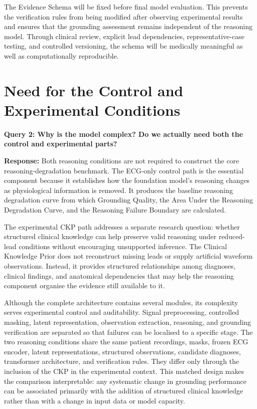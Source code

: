 \documentclass{ssnreview}
\begin{document}
The Evidence Schema will be fixed before final model evaluation. This prevents the
verification rules from being modified after observing experimental results and ensures
that the grounding assessment remains independent of the reasoning model. Through
clinical review, explicit lead dependencies, representative-case testing, and controlled
versioning, the schema will be medically meaningful as well as computationally
reproducible.

\section{Need for the Control and Experimental Conditions}

\textbf{Query 2: Why is the model complex? Do we actually need both the control and
experimental parts?}

\textbf{Response:} Both reasoning conditions are not required to construct the core
reasoning-degradation benchmark. The ECG-only control path is the essential component
because it establishes how the foundation model's reasoning changes as physiological
information is removed. It produces the baseline reasoning degradation curve from which
Grounding Quality, the Area Under the Reasoning Degradation Curve, and the Reasoning
Failure Boundary are calculated.

The experimental CKP path addresses a separate research question: whether structured
clinical knowledge can help preserve valid reasoning under reduced-lead conditions without
encouraging unsupported inference. The Clinical Knowledge Prior does not reconstruct
missing leads or supply artificial waveform observations. Instead, it provides structured
relationships among diagnoses, clinical findings, and anatomical dependencies that may
help the reasoning component organise the evidence still available to it.

Although the complete architecture contains several modules, its complexity serves
experimental control and auditability. Signal preprocessing, controlled masking, latent
representation, observation extraction, reasoning, and grounding verification are separated
so that failures can be localised to a specific stage. The two reasoning conditions share
the same patient recordings, masks, frozen ECG encoder, latent representations, structured
observations, candidate diagnoses, transformer architecture, and verification rules. They
differ only through the inclusion of the CKP in the experimental context. This matched
design makes the comparison interpretable: any systematic change in grounding performance
can be associated primarily with the addition of structured clinical knowledge rather than
with a change in input data or model capacity.
\end{document}
